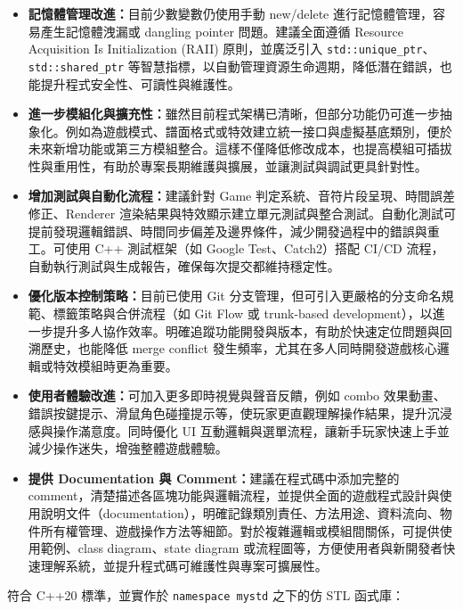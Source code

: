 \documentclass[a4paper,12pt]{article}
\begin{document}
\begin{itemize}
\item \textbf{記憶體管理改進：}目前少數變數仍使用手動 new/delete 進行記憶體管理，容易產生記憶體洩漏或 dangling pointer 問題。建議全面遵循 Resource Acquisition Is Initialization (RAII) 原則，並廣泛引入 \verb|std::unique_ptr|、\verb|std::shared_ptr| 等智慧指標，以自動管理資源生命週期，降低潛在錯誤，也能提升程式安全性、可讀性與維護性。
\item \textbf{進一步模組化與擴充性：}雖然目前程式架構已清晰，但部分功能仍可進一步抽象化。例如為遊戲模式、譜面格式或特效建立統一接口與虛擬基底類別，便於未來新增功能或第三方模組整合。這樣不僅降低修改成本，也提高模組可插拔性與重用性，有助於專案長期維護與擴展，並讓測試與調試更具針對性。
\item \textbf{增加測試與自動化流程：}建議針對 Game 判定系統、音符片段呈現、時間誤差修正、Renderer 渲染結果與特效顯示建立單元測試與整合測試。自動化測試可提前發現邏輯錯誤、時間同步偏差及邊界條件，減少開發過程中的錯誤與重工。可使用 C++ 測試框架（如 Google Test、Catch2）搭配 CI/CD 流程，自動執行測試與生成報告，確保每次提交都維持穩定性。
\item \textbf{優化版本控制策略：}目前已使用 Git 分支管理，但可引入更嚴格的分支命名規範、標籤策略與合併流程（如 Git Flow 或 trunk-based development），以進一步提升多人協作效率。明確追蹤功能開發與版本，有助於快速定位問題與回溯歷史，也能降低 merge conflict 發生頻率，尤其在多人同時開發遊戲核心邏輯或特效模組時更為重要。
\item \textbf{使用者體驗改進：}可加入更多即時視覺與聲音反饋，例如 combo 效果動畫、錯誤按鍵提示、滑鼠角色碰撞提示等，使玩家更直觀理解操作結果，提升沉浸感與操作滿意度。同時優化 UI 互動邏輯與選單流程，讓新手玩家快速上手並減少操作迷失，增強整體遊戲體驗。
\item \textbf{提供 Documentation 與 Comment：}建議在程式碼中添加完整的 comment，清楚描述各區塊功能與邏輯流程，並提供全面的遊戲程式設計與使用說明文件（documentation），明確記錄類別責任、方法用途、資料流向、物件所有權管理、遊戲操作方法等細節。對於複雜邏輯或模組間關係，可提供使用範例、class diagram、state diagram 或流程圖等，方便使用者與新開發者快速理解系統，並提升程式碼可維護性與專案可擴展性。
\end{itemize}
符合 C++20 標準，並實作於 \texttt{namespace mystd} 之下的仿 STL 函式庫：
\end{document}
